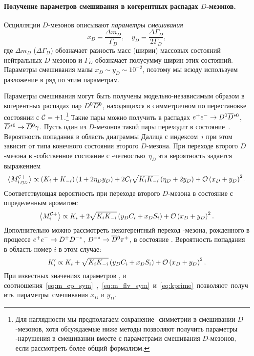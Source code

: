 \paragraph{\boldmath Получение параметров смешивания в когерентных распадах $D$-мезонов.  }  Осцилляции $D$-мезонов описывают \emph{параметры смешивания}
\begin{equation}
 x_D \equiv \frac{\Delta m_D}{\Gamma_D},\quad y_D \equiv \frac{\Delta\Gamma_D}{2\Gamma_D},
\end{equation}
где $\Delta m_D$ ($\Delta\Gamma_D$) обозначает разность масс (ширин) массовых состояний нейтральных $D$-мезонов и $\Gamma_D$ обозначает полусумму ширин этих состояний.  Параметры смешивания малы $x_D\sim y_D\sim 10^{-2}$, поэтому мы всюду используем разложение в ряд по этим параметрам.

Параметры смешивания могут быть получены модельно-независимым образом в когерентных распадах пар $D^0\overline{D}{}^0$, находящихся в симметричном по перестановке состоянии с $\mathcal{C}=+1$.\footnote{Для наглядности мы предполагаем сохранение \cpconj-симметрии в смешивании $D$-мезонов, хотя обсуждаемые ниже методы позволяют получить параметры \cpconj-нарушения в смешивании вместе с параметрами смешивания $D$-мезонов, если рассмотреть более общий формализм.}  Такие пары можно получить в распадах $e^+e^-\to D^0\overline{D}{}^{*0}$, $\overline{D}{}^{*0}\to\overline{D}{}^0\gamma$.  Пусть один из $D$-мезонов такой пары переходит в состояние~\kspp.  Вероятность попадания в область диаграммы Далица с индексом~$i$ при этом зависит от типа конечного состояния второго $D$-мезона.  При переходе второго $D$-мезона в \cpconj-собственное состояние с \cpconj-четностью~$\eta_D$ эта вероятность задается выражением
\begin{equation}\label{eq:m_cp_sym}
   \left<M^{\cconj+}_{i,\eta_D}\right> 
   \propto \lbr\ki+\kmi\rbr\lbr1 + 2\eta_D y_D\rbr + 2\ci\sqrt{\ki\kmi}\lbr\eta_D + 2y_D\rbr %
   + \oxdydsq.
\end{equation}
Соответствующая вероятность при переходе второго $D$-мезона в состояние с определенным ароматом:
\begin{equation}\label{eq:m_flv_sym}
 \left<M^{\mathcal{C}+}_{i}\right> 
 \propto K_i + 2\sqrt{K_iK_{-i}}\left( y_DC_i+x_DS_i\right) + \mathcal{O}\left(x_D+y_D\right)^2.
\end{equation}
Дополнительно можно рассмотреть некогерентный переход \dnbar-мезона, рожденного в процессе $e^+e^-\to D^+D^{-*}$, $D^{-*}\to\overline{D}{}^0\pi^+$, в состояние \kspp.  Вероятность попадания в область номер $i$ в этом случае:
\begin{equation}\label{eq:kprime}
 K_i^{\prime} \propto K_i + \sqrt{K_iK_{-i}}\left( y_DC_i + x_DS_i\right) + \mathcal{O}\left(x_D+y_D\right)^2.
\end{equation}
При известных значениях параметров \ki, \ci и \si соотношения~\eqref{eq:m_cp_sym}, \eqref{eq:m_flv_sym} и~\eqref{eq:kprime} позволяют получить параметры смешивания $x_D$ и $y_D$.  

